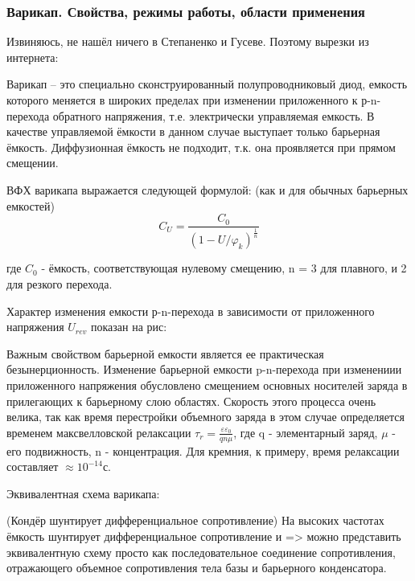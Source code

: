 \subsubsection{Варикап. Свойства, режимы работы, области применения}

Извиняюсь, не нашёл ничего в Степаненко и Гусеве. Поэтому вырезки из интернета:

Варикап – это специально сконструированный полупроводниковый диод, емкость которого меняется в широких пределах при изменении приложенного к р-n-перехода обратного напряжения, т.е. электрически управляемая емкость. В качестве управляемой ёмкости в данном случае выступает только барьерная ёмкость. Диффузионная ёмкость не подходит, т.к. она проявляется при прямом смещении.

ВФХ варикапа выражается следующей формулой: (как и для обычных барьерных емкостей)
$$
C_U = \frac{C_0}{(1 - U/\varphi_k)^\frac{1}{n}}
$$

где $C_0$ - ёмкость, соответствующая нулевому смещению, n = 3 для плавного, и 2 для резкого перехода.

Характер изменения емкости р-n-перехода в зависимости от приложенного напряжения $U_{rev}$ показан на рис:

\begin{center}
	\begin{figure}[h!]
		\caption{}	
	\end{figure}
\end{center}

Важным свойством барьерной емкости является ее практическая безынерционность. Изменение барьерной емкости p-n-перехода при изменениии приложенного напряжения обусловлено смещением основных носителей заряда в прилегающих к барьерному слою областях. Скорость этого процесса очень велика, так как время перестройки объемного заряда в этом случае определяется временем максвелловской релаксации $\tau_r = \frac{\varepsilon\varepsilon_0}{qn\mu}$, где q - элементарный заряд, $\mu$ - его подвижность, n - концентрация. Для кремния, к примеру, время релаксации составляет $\approx 10^{-14}$с.

Эквивалентная схема варикапа:
\begin{center}
	\begin{figure}[h!]
		\caption{}	
	\end{figure}
\end{center}
(Кондёр шунтирует дифференциальное сопротивление)
На высоких частотах ёмкость шунтирует дифференциальное сопротивление и => можно представить эквивалентную схему просто как последовательное соединение сопротивления, отражающего объемное сопротивления тела базы и барьерного конденсатора.

